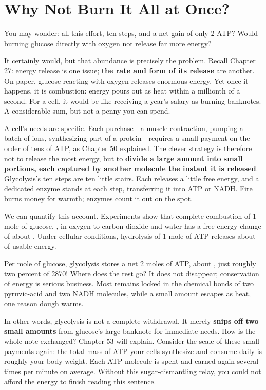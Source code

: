 \section{Why Not Burn It All at Once?}

You may wonder: all this effort, ten steps, and a net gain of only 2 ATP? Would burning glucose directly with oxygen not release far more energy?

It certainly would, but that abundance is precisely the problem. Recall Chapter 27: energy release is one issue; \textbf{the rate and form of its release} are another. On paper, glucose reacting with oxygen releases enormous energy. Yet once it happens, it is combustion: energy pours out as heat within a millionth of a second. For a cell, it would be like receiving a year's salary as burning banknotes. A considerable sum, but not a penny you can spend.

A cell's needs are specific. Each purchase---a muscle contraction, pumping a batch of ions, synthesizing part of a protein---requires a small payment on the order of tens of ATP, as Chapter 50 explained. The clever strategy is therefore not to release the most energy, but to \textbf{divide a large amount into small portions, each captured by another molecule the instant it is released}. Glycolysis's ten steps are ten little stairs. Each releases a little free energy, and a dedicated enzyme stands at each step, transferring it into ATP or NADH. Fire burns money for warmth; enzymes count it out on the spot.

\begin{qiaoliang}
We can quantify this account. Experiments show that complete combustion of 1 mole of glucose, , in oxygen to carbon dioxide and water has a free-energy change of about . Under cellular conditions, hydrolysis of 1 mole of ATP releases about  of usable energy.

Per mole of glucose, glycolysis stores a net 2 moles of ATP, about , just roughly two percent of 2870! Where does the rest go? It does not disappear; conservation of energy is serious business. Most remains locked in the chemical bonds of two pyruvic-acid and two NADH molecules, while a small amount escapes as heat, one reason dough warms.

In other words, glycolysis is not a complete withdrawal. It merely \textbf{snips off two small amounts} from glucose's large banknote for immediate needs. How is the whole note exchanged? Chapter 53 will explain. Consider the scale of these small payments again: the total mass of ATP your cells synthesize and consume daily is roughly your body weight. Each ATP molecule is spent and earned again several times per minute on average. Without this sugar-dismantling relay, you could not afford the energy to finish reading this sentence.
\end{qiaoliang}

